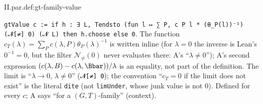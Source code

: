 \begin{definition}
\end{definition}
\begin{tfformal}{II.par.def:gt-family-value}
\begin{tffidelity}
\texttt{gtValue c := if h : ∃ L, Tendsto (fun l ↦ ∑ P, c P l * (θ\_P(l))⁻¹) (𝓝[≠] 0) (𝓝 L) then h.choose else 0}. The function $c_T(\lambda)=\sum_Pc(\lambda,P)\theta_P(\lambda)^{-1}$ is written inline (for $\lambda=0$ the inverse is Lean's $0^{-1}=0$, but the filter $\mathcal N_{\ne}(0)$ never evaluates there: A's ``$\lambda\ne0$''); A's second expression $(c(\lambda,B)-c(\lambda,\Bbar))/\lambda$ is an equality, not part of the definition. The limit is ``$\lambda\to0$, $\lambda\ne0$'' (\texttt{𝓝[≠] 0}); the convention ``$c_T=0$ if the limit does not exist'' is the literal \texttt{dite} (not \texttt{limUnder}, whose junk value is not $0$). Defined for every $c$; A says ``for a $(G,T)$-family'' (context).
\end{tffidelity}
\end{tfformal}

